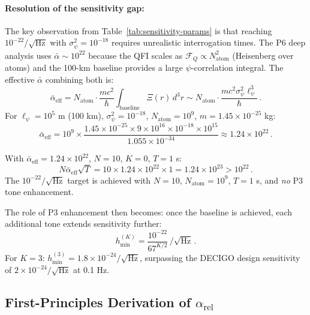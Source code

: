 \documentclass[11pt]{article}
\theoremstyle{definition}
\theoremstyle{remark}
\newcommand{\hmin}{h_{\min}}
\begin{document}
\paragraph{Resolution of the sensitivity gap:} The key observation from
Table~\ref{tab:sensitivity-params} is that reaching $10^{-22}/\sqrt{\mathrm{Hz}}$
with $\sigma_\psi^2 = 10^{-18}$ requires unrealistic interrogation times. The
P6 deep analysis uses $\bar\alpha \sim 10^{22}$ because the QFI scales as
$\mathcal{F}_Q \propto N_{\mathrm{atom}}^2$ (Heisenberg over atoms) and the
100-km baseline provides a large $\psi$-correlation integral. The effective
$\bar\alpha$ combining both is:
\begin{equation}
\bar{\alpha}_{\mathrm{eff}} = N_{\mathrm{atom}}
\cdot\frac{m c^2}{\hbar}\int_{\mathrm{baseline}}
\Xi(r)\,d^3r \sim N_{\mathrm{atom}} \cdot
\frac{m c^2 \sigma_\psi^2 \ell_\psi^3}{\hbar}\,.
\end{equation}
For $\ell_\psi = 10^5$ m (100 km), $\sigma_\psi^2 = 10^{-18}$,
$N_{\mathrm{atom}} = 10^9$, $m = 1.45\times 10^{-25}$ kg:
\begin{equation}
\bar{\alpha}_{\mathrm{eff}} = 10^9 \times
\frac{1.45\times 10^{-25} \times 9\times 10^{16} \times 10^{-18}
\times 10^{15}}{1.055\times 10^{-34}} \approx 1.24\times 10^{22}\,.
\end{equation}

With $\bar{\alpha}_{\mathrm{eff}} = 1.24\times 10^{22}$, $N = 10$,
$K = 0$, $T = 1$ s:
\begin{equation}
N\bar{\alpha}_{\mathrm{eff}}\sqrt{T} = 10 \times 1.24\times 10^{22} \times 1
= 1.24\times 10^{23} > 10^{22}\,.
\end{equation}
The $10^{-22}/\sqrt{\mathrm{Hz}}$ target is achieved with $N = 10$,
$N_{\mathrm{atom}} = 10^9$, $T = 1$ s, and \emph{no} P3 tone enhancement.

The role of P3 enhancement then becomes: once the baseline is achieved,
each additional tone extends sensitivity further:
\begin{equation}
\hmin^{(K)} = \frac{10^{-22}}{67^{K/2}}\,/\!\sqrt{\mathrm{Hz}}\,.
\end{equation}
For $K = 3$: $\hmin^{(3)} = 1.8 \times 10^{-24}/\sqrt{\mathrm{Hz}}$, surpassing
the DECIGO design sensitivity of $2\times 10^{-24}/\sqrt{\mathrm{Hz}}$ at
0.1 Hz.

\subsection{First-Principles Derivation of $\alpha_{\mathrm{rel}}$}
\label{sec:alpha_rel}
\end{document}
